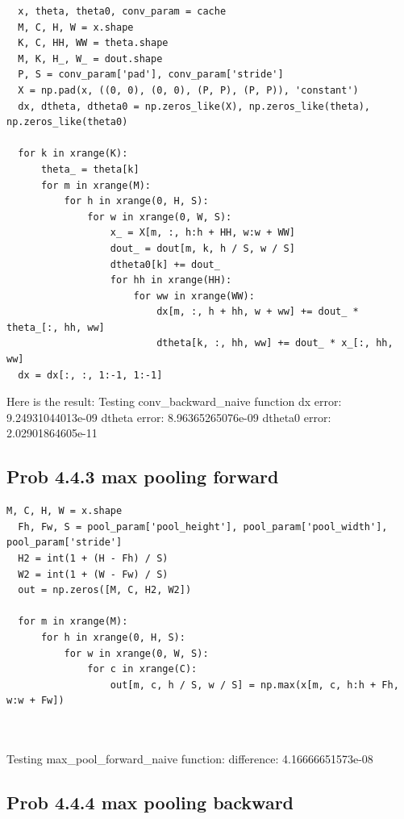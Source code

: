 \documentclass[12pt]{article}
\begin{document}
\begin{lstlisting}
  x, theta, theta0, conv_param = cache
  M, C, H, W = x.shape
  K, C, HH, WW = theta.shape
  M, K, H_, W_ = dout.shape
  P, S = conv_param['pad'], conv_param['stride']
  X = np.pad(x, ((0, 0), (0, 0), (P, P), (P, P)), 'constant')
  dx, dtheta, dtheta0 = np.zeros_like(X), np.zeros_like(theta), np.zeros_like(theta0)

  for k in xrange(K):
      theta_ = theta[k]
      for m in xrange(M):
          for h in xrange(0, H, S):
              for w in xrange(0, W, S):
                  x_ = X[m, :, h:h + HH, w:w + WW]
                  dout_ = dout[m, k, h / S, w / S]
                  dtheta0[k] += dout_
                  for hh in xrange(HH):
                      for ww in xrange(WW):
                          dx[m, :, h + hh, w + ww] += dout_ * theta_[:, hh, ww]
                          dtheta[k, :, hh, ww] += dout_ * x_[:, hh, ww]
  dx = dx[:, :, 1:-1, 1:-1]

\end{lstlisting}
Here is the result:
Testing conv\_backward\_naive function
dx error:  9.24931044013e-09
dtheta error:  8.96365265076e-09
dtheta0 error:  2.02901864605e-11





\subsection*{Prob 4.4.3 max pooling forward}

\begin{lstlisting}
M, C, H, W = x.shape
  Fh, Fw, S = pool_param['pool_height'], pool_param['pool_width'], pool_param['stride']
  H2 = int(1 + (H - Fh) / S)
  W2 = int(1 + (W - Fw) / S)
  out = np.zeros([M, C, H2, W2])

  for m in xrange(M):
      for h in xrange(0, H, S):
          for w in xrange(0, W, S):
              for c in xrange(C):
                  out[m, c, h / S, w / S] = np.max(x[m, c, h:h + Fh, w:w + Fw])
    
 
\end{lstlisting}

Testing max\_pool\_forward\_naive function:
difference:  4.16666651573e-08
\subsection*{Prob 4.4.4 max pooling backward}
\end{document}
